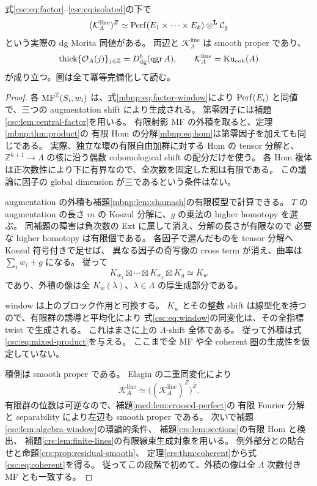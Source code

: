 \begin{proposition}[中心因子を残す直接積比較]
\label{csc:prop:mixed-product}
式\eqref{csc:eq:factor}--\eqref{csc:eq:isolated}の下で
\begin{equation}\label{csc:eq:mixed-product}
 (\mathcal K_A^{\mathrm{line}})^Z
       \simeq \operatorname{Perf}(E_1\times\cdots\times E_k)
                         \otimes^{\mathbf L}\mathcal C_g
\end{equation}
という実際の dg Morita 同値がある。
両辺と $\mathcal K_A^{\mathrm{line}}$ は smooth proper であり、
\begin{equation}\label{csc:eq:coherent}
 \operatorname{thick}\{\mathcal O_A(j)\}_{j\in\mathbb Z}
       =D^b_{\mathrm{dg}}(\operatorname{qgr}A),\qquad
 \mathcal K_A^{\mathrm{line}}=\operatorname{Ku}_{\mathrm{coh}}(A)
\end{equation}
が成り立つ。圏は全て冪等完備化して読む。
\end{proposition}
\begin{proof}
各 $\operatorname{MF}^{\mathbb Z}(S_i,w_i)$ は、式\eqref{mbnp:eq:factor-window}により
$\operatorname{Perf}(E_i)$ と同値で、三つの augmentation shift により生成される。
第零因子には補題\ref{csc:lem:central-factor}を用いる。
有限射影 MF の外積を取ると、定理\ref{mbnp:thm:product}の
有限 Hom の分解\eqref{mbnp:eq:hom}は第零因子を加えても同じである。
実際、独立な環の有限自由加群に対する Hom の tensor 分解と、
$\mathbb Z^{k+1}\to\Lambda$ の核に沿う偶数 cohomological shift の配分だけを使う。
各 Hom 複体は正次数性により下に有界なので、全次数を固定した和は有限である。
この議論に因子の global dimension が三であるという条件はない。

augmentation の外積も補題\ref{mbnp:lem:shamash}の有限模型で計算できる。
$T$ の augmentation の長さ $m$ の Koszul 分解に、$g$ の乗法の
higher homotopy を選ぶ。
同補題の障害は負次数の Ext に属して消え、分解の長さが有限なので
必要な higher homotopy は有限個である。
各因子で選んだものを tensor 分解へ Koszul 符号付きで足せば、
異なる因子の奇写像の cross term が消え、曲率は $\sum_iw_i+g$ になる。
従って
\[
 K_{w_1}\boxtimes\cdots\boxtimes K_{w_k}\boxtimes K_g\simeq K_w
\]
であり、外積の像は全 $K_w(\lambda)$、$\lambda\in\Lambda$ の厚生成部分である。

window は上のブロック作用と可換する。
$K_w$ とその整数 shift は線型化を持つので、有限群の誘導と平均化により
式\eqref{csc:eq:window}の同変化は、その全指標 twist で生成される。
これはまさに上の $\Lambda$-shift 全体である。
従って外積は式\eqref{csc:eq:mixed-product}を与える。
ここまで全 MF や全 coherent 圏の生成性を仮定していない。

積側は smooth proper である。
Elagin の二重同変化\cite[Theorem~4.2, Section~8]{MEDElagin}により
\[
 \mathcal K_A^{\mathrm{line}}
       \simeq\bigl((\mathcal K_A^{\mathrm{line}})^Z\bigr)^{\widehat Z}.
\]
有限群の位数は可逆なので、補題\ref{med:lem:crossed-perfect}の
有限 Fourier 分解と separability により左辺も smooth proper である。
次いで補題\ref{csc:lem:algebra-window}の環論的条件、
補題\ref{crs:lem:sections}の有限 Hom と検出、
補題\ref{crs:lem:finite-lines}の有限線束生成対象を用いる。
例外部分との貼合せと命題\ref{crs:prop:residual-smooth}、
定理\ref{crs:thm:coherent}から式\eqref{csc:eq:coherent}を得る。
従ってこの段階で初めて、外積の像は全 $\Lambda$ 次数付き MF とも一致する。
\end{proof}

